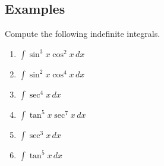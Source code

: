 \documentclass[11pt]{article}
\theoremstyle{definition}
\theoremstyle{named}
\numberwithin{myalgctr}{section}
\begin{document}
\subsection*{Examples}
Compute the following indefinite integrals.
\begin{enumerate}
  \item $\displaystyle \int \sin^3x \cos^2 x\, dx$
  \item $\displaystyle \int \sin^2 x\cos^4 x\, dx$
  \item $\displaystyle \int \sec^4 x\, dx$
  \item $\displaystyle \int \tan^5 x\sec^7 x\, dx$
  \item $\displaystyle \int \sec^3 x\, dx$
  \item $\displaystyle \int \tan^5 x \, dx$

\end{enumerate}
\end{document}
